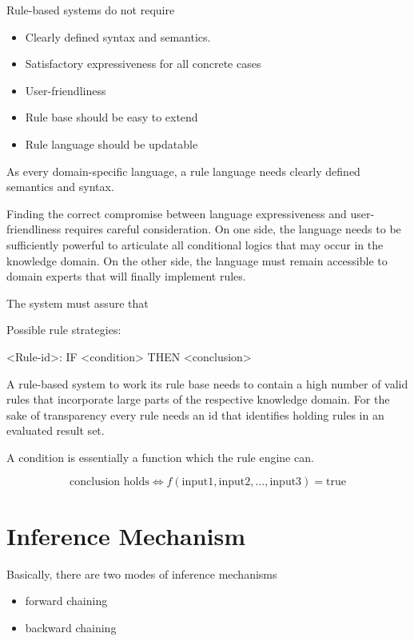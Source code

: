 Rule-based systems do not require


\begin{itemize}
    \item Clearly defined syntax and semantics.
    \item Satisfactory expressiveness for all concrete cases
    \item User-friendliness
    \item Rule base should be easy to extend
    \item Rule language should be updatable
\end{itemize}

As every domain-specific language, a rule language needs clearly defined semantics and syntax.


Finding the correct compromise between language expressiveness and user-friendliness\cite{https://doi.org/10.1002/widm.11} requires careful consideration.
On one side,
the language needs
to be sufficiently powerful to articulate all conditional logics that may occur in the knowledge domain.
On the other side, the language must remain accessible to domain experts that will finally implement rules.

The system must assure that



Possible rule strategies:

<Rule-id>: IF <condition> THEN <conclusion>

A rule-based system to work its rule base needs
to contain a high number of valid rules that incorporate large parts of the respective knowledge domain.
For the sake of transparency every rule needs an id that identifies holding rules in an evaluated result set.

A condition is essentially a function which the rule engine can.

\[
    \text{conclusion holds} \Leftrightarrow f(\text{input1}, \text{input2}, \ldots, \text{input3}) = \text{true}
\]

\section{Inference Mechanism}

Basically, there are two modes of inference mechanisms\cite{https://doi.org/10.1002/widm.11}

\begin{itemize}
    \item forward chaining
    \item backward chaining
\end{itemize}


